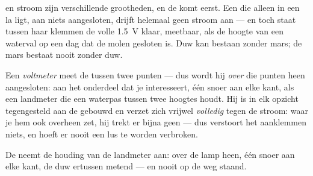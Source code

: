 \begin{proposition}\label{prop:g8:voltage-voltmeter:nocurrent}
 en stroom zijn verschillende grootheden, en de
 komt eerst. Een  die alleen in een la
ligt, aan niets aangesloten, drijft helemaal geen stroom aan --- en
toch staat tussen haar klemmen de volle \qty{1.5}{V} klaar,
meetbaar, als de hoogte van een waterval op een dag dat de molen
gesloten is. Duw kan bestaan zonder mars; de mars bestaat nooit zonder
duw.
\end{proposition}

\begin{definition}[Voltmeter]\label{def:g8:voltage-voltmeter:voltmeter}
Een \emph{voltmeter} meet de
 tussen twee punten --- dus wordt hij \emph{over} die
punten heen aangesloten: \emph{} aan het onderdeel dat je
interesseert, één snoer aan elke kant, als een landmeter die een
waterpas tussen twee hoogtes houdt. Hij is in elk opzicht tegengesteld
aan de  gebouwd en verzet zich vrijwel
\emph{volledig} tegen de stroom: waar je hem ook overheen zet, hij
trekt er bijna geen --- dus verstoort het aanklemmen niets, en hoeft er
nooit een lus te worden verbroken.
\end{definition}

\begin{omfigure}

{\small De  neemt de houding van de landmeter aan: over
de lamp heen, één snoer aan elke kant, de duw ertussen metend --- en
nooit op de weg staand.}
\end{omfigure}

